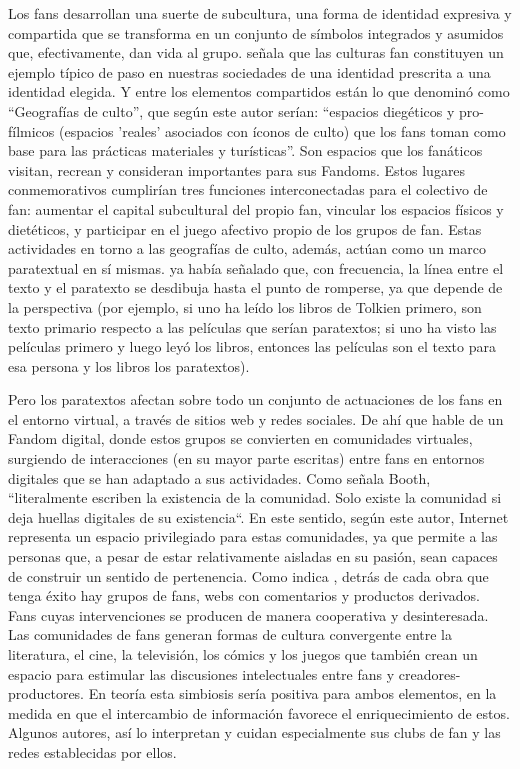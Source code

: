 \documentclass[spanish]{textolivre}
\begin{document}
Los fans desarrollan una suerte de subcultura, una forma de identidad expresiva y compartida que se transforma en un conjunto de símbolos integrados y asumidos que, efectivamente, dan vida al grupo. \textcite{lebart_strategies_2004} señala que las culturas fan constituyen un ejemplo típico de paso en nuestras sociedades de una identidad prescrita a una identidad elegida. Y entre los elementos compartidos están lo que \textcite[p. 114]{hills_fan_2002} denominó como “Geografías de culto”, que según este autor serían: “espacios diegéticos y pro-fílmicos (espacios 'reales' asociados con íconos de culto) que los fans toman como base para las prácticas materiales y turísticas”. Son espacios que los fanáticos visitan, recrean y consideran importantes para sus Fandoms. Estos lugares conmemorativos cumplirían tres funciones interconectadas para el colectivo de fan: aumentar el capital subcultural del propio fan, vincular los espacios físicos y dietéticos, y participar en el juego afectivo propio de los grupos de fan. Estas actividades en torno a las geografías de culto, además, actúan como un marco paratextual en sí mismas. \textcite{gray_show_2010} ya había señalado que, con frecuencia, la línea entre el texto y el paratexto se desdibuja hasta el punto de romperse, ya que depende de la perspectiva (por ejemplo, si uno ha leído los libros de Tolkien primero, son texto primario respecto a las películas que serían paratextos; si uno ha visto las películas primero y luego leyó los libros, entonces las películas son el texto para esa persona y los libros los paratextos).

Pero los paratextos afectan sobre todo un conjunto de actuaciones de los fans en el entorno virtual, a través de sitios web y redes sociales.  De ahí que \textcite[p. 33]{booth_digital_2010} hable de un Fandom digital, donde estos grupos se convierten en comunidades virtuales, surgiendo de interacciones (en su mayor parte escritas) entre fans en entornos digitales que se han adaptado a sus actividades. Como señala Booth, “literalmente escriben la existencia de la comunidad. Solo existe la comunidad si deja huellas digitales de su existencia“. En este sentido, según este autor, Internet representa un espacio privilegiado para estas comunidades, ya que permite a las personas que, a pesar de estar relativamente aisladas en su pasión, sean capaces de construir un sentido de pertenencia. Como indica \textcite{cassany_daniel_coord._fandom_2019,cassany_laboratorio_2019}, detrás de cada obra que tenga éxito hay grupos de fans, webs con comentarios y productos derivados. Fans cuyas intervenciones se producen de manera cooperativa y desinteresada.
Las comunidades de fans generan formas de cultura convergente entre la literatura, el cine, la televisión, los cómics y los juegos que también crean un espacio para estimular las discusiones intelectuales entre fans y creadores-productores. En teoría esta simbiosis sería positiva para ambos elementos, en la medida en que el intercambio de información favorece el enriquecimiento de estos. Algunos autores, así lo interpretan y cuidan especialmente sus clubs de fan y las redes establecidas por ellos.
\end{document}
